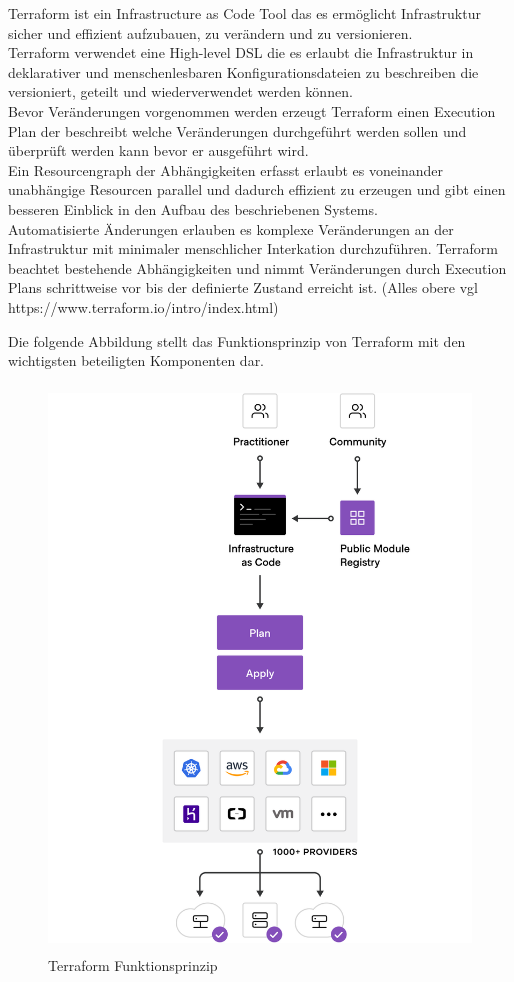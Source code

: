 \begin{spacing}{1.2}
Terraform ist ein Infrastructure as Code Tool das es ermöglicht Infrastruktur
sicher und effizient aufzubauen, zu verändern und zu versionieren.\\
Terraform verwendet eine High-level DSL die es erlaubt die Infrastruktur in
deklarativer und menschenlesbaren Konfigurationsdateien zu beschreiben die
versioniert, geteilt und wiederverwendet werden können.\\
Bevor Veränderungen vorgenommen werden erzeugt Terraform einen Execution
Plan der beschreibt welche Veränderungen durchgeführt werden sollen und
überprüft werden kann bevor er ausgeführt wird.\\
Ein Resourcengraph der Abhängigkeiten erfasst erlaubt es voneinander
unabhängige Resourcen parallel und dadurch effizient zu erzeugen und gibt
einen besseren Einblick in den Aufbau des beschriebenen Systems.\\
Automatisierte Änderungen erlauben es komplexe Veränderungen an der
Infrastruktur mit minimaler menschlicher Interkation durchzuführen.
Terraform beachtet bestehende Abhängigkeiten und nimmt Veränderungen
durch Execution Plans schrittweise vor bis der definierte Zustand erreicht
ist. (Alles obere vgl https://www.terraform.io/intro/index.html)

Die folgende Abbildung stellt das Funktionsprinzip von Terraform mit den
wichtigsten beteiligten Komponenten dar.

\begin{figure}[H]
  \includegraphics[keepaspectratio, height=15cm]{fig/hauptteil/Terraform.png}
  \caption{Terraform Funktionsprinzip}
  \centering
\end{figure}


\end{spacing}
